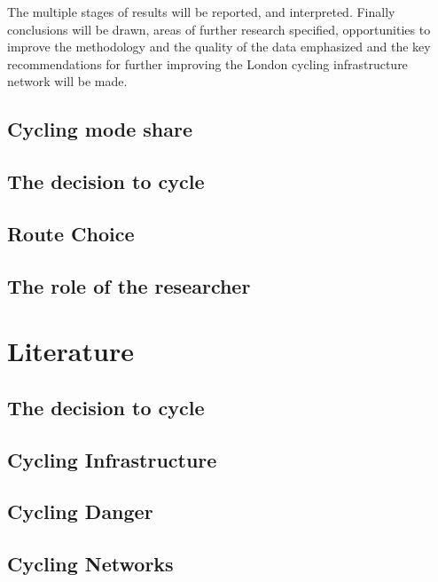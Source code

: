 \documentclass[11pt]{article} %
\begin{document}
The multiple stages of results will be reported, and interpreted. Finally conclusions will be drawn, areas of further research specified, opportunities to improve the methodology and the quality of the data emphasized and the key recommendations for further improving the London cycling infrastructure network will be made. 

\subsection{Cycling mode share}



\subsection{The decision to cycle}



\subsection{Route Choice}



\subsection{The role of the researcher}



\section{Literature}

\subsection{The decision to cycle}

\subsection{Cycling Infrastructure}

\subsection{Cycling Danger}

\subsection{Cycling Networks}
\end{document}
